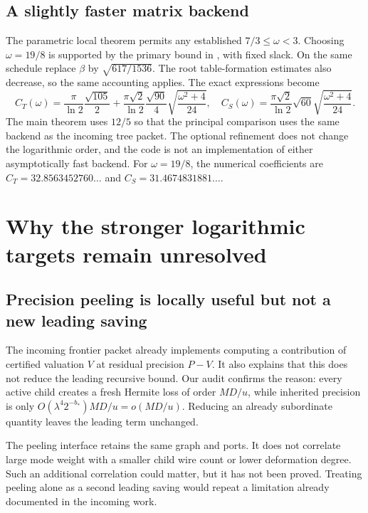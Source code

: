\documentclass[11pt,letterpaper]{article}
\theoremstyle{remark}\newtheorem{remark}[theorem]{Remark}
\begin{document}
\subsection{A slightly faster matrix backend}

The parametric local theorem permits any established $7/3\le\omega<3$.
Choosing $\omega=19/8$ is supported by the primary bound in \cite{mm},
with fixed slack. On the same schedule replace $\beta$ by
$\sqrt{617/1536}$. The root table-formation estimates also decrease, so
the same accounting applies. The exact expressions become
\[
 C_T(\omega)=\frac\pi{\ln2}\frac{\sqrt{105}}2
       +\frac{\pi\sqrt2}{\ln2}\frac{\sqrt{90}}4
            \sqrt{\frac{\omega^2+4}{24}},
\quad
 C_S(\omega)=\frac{\pi\sqrt2}{\ln2}\sqrt{60}
            \sqrt{\frac{\omega^2+4}{24}}.
\]
The main theorem uses $12/5$ so that the principal comparison uses the
same backend as the incoming tree packet. The optional refinement does
not change the logarithmic order, and the code is not an implementation
of either asymptotically fast backend.
For $\omega=19/8$, the numerical coefficients are
$C_T=32.8563452760\ldots$ and $C_S=31.4674831881\ldots$.

\section{Why the stronger logarithmic targets remain unresolved}
\label{sec:barriers}

\subsection{Precision peeling is locally useful but not a new leading saving}

The incoming frontier packet already implements computing a contribution
of certified valuation $V$ at residual precision $P-V$. It also explains
that this does not reduce the leading recursive bound. Our audit confirms
the reason: every active child creates a fresh Hermite loss of order
$MD/u$, while inherited precision is only
$O(\lambda^4 2^{-b_*})MD/u=o(MD/u)$. Reducing an already subordinate
quantity leaves the leading term unchanged.

The peeling interface retains the same graph and ports. It does not
correlate large mode weight with a smaller child wire count or lower
deformation degree. Such an additional correlation could matter, but it
has not been proved. Treating peeling alone as a second leading saving
would repeat a limitation already documented in the incoming work.
\end{document}
